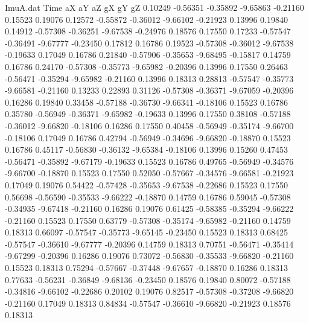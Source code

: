 \begin{filecontents}{ImuA.dat}
Time aX aY aZ gX gY gZ
   0.10249   -0.56351   -0.35892   -9.65863   -0.21160    0.15523    0.19076
   0.12572   -0.55872   -0.36012   -9.66102   -0.21923    0.13996    0.19840
   0.14912   -0.57308   -0.36251   -9.67538   -0.24976    0.18576    0.17550
   0.17233   -0.57547   -0.36491   -9.67777   -0.23450    0.17812    0.16786
   0.19523   -0.57308   -0.36012   -9.67538   -0.19633    0.17049    0.16786
   0.21840   -0.57906   -0.35653   -9.68495   -0.15817    0.14759    0.16786
   0.24170   -0.57308   -0.35773   -9.65982   -0.20396    0.13996    0.17550
   0.26463   -0.56471   -0.35294   -9.65982   -0.21160    0.13996    0.18313
   0.28813   -0.57547   -0.35773   -9.66581   -0.21160    0.13233    0.22893
   0.31126   -0.57308   -0.36371   -9.67059   -0.20396    0.16286    0.19840
   0.33458   -0.57188   -0.36730   -9.66341   -0.18106    0.15523    0.16786
   0.35780   -0.56949   -0.36371   -9.65982   -0.19633    0.13996    0.17550
   0.38108   -0.57188   -0.36012   -9.66820   -0.18106    0.16286    0.17550
   0.40458   -0.56949   -0.35174   -9.66700   -0.18106    0.17049    0.16786
   0.42794   -0.56949   -0.34696   -9.66820   -0.18870    0.15523    0.16786
   0.45117   -0.56830   -0.36132   -9.65384   -0.18106    0.13996    0.15260
   0.47453   -0.56471   -0.35892   -9.67179   -0.19633    0.15523    0.16786
   0.49765   -0.56949   -0.34576   -9.66700   -0.18870    0.15523    0.17550
   0.52050   -0.57667   -0.34576   -9.66581   -0.21923    0.17049    0.19076
   0.54422   -0.57428   -0.35653   -9.67538   -0.22686    0.15523    0.17550
   0.56698   -0.56590   -0.35533   -9.66222   -0.18870    0.14759    0.16786
   0.59045   -0.57308   -0.34935   -9.67418   -0.21160    0.16286    0.19076
   0.61425   -0.58385   -0.35294   -9.66222   -0.21160    0.15523    0.17550
   0.63779   -0.57308   -0.35174   -9.65982   -0.21160    0.14759    0.18313
   0.66097   -0.57547   -0.35773   -9.65145   -0.23450    0.15523    0.18313
   0.68425   -0.57547   -0.36610   -9.67777   -0.20396    0.14759    0.18313
   0.70751   -0.56471   -0.35414   -9.67299   -0.20396    0.16286    0.19076
   0.73072   -0.56830   -0.35533   -9.66820   -0.21160    0.15523    0.18313
   0.75294   -0.57667   -0.37448   -9.67657   -0.18870    0.16286    0.18313
   0.77633   -0.56231   -0.36849   -9.68136   -0.23450    0.18576    0.19840
   0.80072   -0.57188   -0.34816   -9.66102   -0.22686    0.20102    0.19076
   0.82517   -0.57308   -0.37208   -9.66820   -0.21160    0.17049    0.18313
   0.84834   -0.57547   -0.36610   -9.66820   -0.21923    0.18576    0.18313

\end{filecontents}
